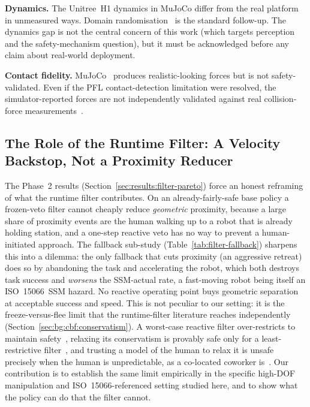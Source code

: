 \documentclass[11pt,a4paper]{report}
\newcommand{\ssm}{SSM}
\newcommand{\pfl}{PFL}
\newcommand{\iso}{ISO~15066}
\begin{document}
\textbf{Dynamics.} The Unitree~H1 dynamics in MuJoCo differ from
the real platform in unmeasured ways. Domain
randomisation~\cite{tobin2017domainrand,zhao2020sim2real} is the
standard follow-up. The dynamics gap is not the central concern of
this work (which targets perception and the safety-mechanism
question), but it must be acknowledged before any claim about
real-world deployment.

\textbf{Contact fidelity.} MuJoCo~\cite{todorov2012mujoco} produces
realistic-looking forces but is not safety-validated. Even if the
\pfl{} contact-detection limitation were resolved, the
simulator-reported forces are not independently validated against
real collision-force measurements~\cite{svarny2020collision}.

\subsection{The Role of the Runtime Filter: A Velocity Backstop, Not a Proximity Reducer}
\label{sec:disc:filter-role}

The Phase~2 results (Section~\ref{sec:results:filter-pareto}) force an
honest reframing of what the runtime filter contributes. On an
already-fairly-safe base policy a frozen-veto filter cannot cheaply
reduce \emph{geometric} proximity, because a large share of proximity
events are the human walking up to a robot that is already holding
station, and a one-step reactive veto has no way to prevent a
human-initiated approach. The fallback sub-study
(Table~\ref{tab:filter-fallback}) sharpens this into a dilemma: the
only fallback that cuts proximity (an aggressive retreat) does so by
abandoning the task and accelerating the robot, which both destroys
task success and \emph{worsens} the \ssm{}-actual rate, a fast-moving
robot being itself an \iso{}~\ssm{} hazard. No reactive operating point
buys geometric separation at acceptable success and speed. This is not
peculiar to our setting: it is the freeze-versus-flee limit that the
runtime-filter literature reaches independently
(Section~\ref{sec:bg:cbf:conservatism}). A worst-case reactive filter
over-restricts to maintain safety~\cite{tian2022confidence}, relaxing
its conservatism is provably safe only for a least-restrictive
filter~\cite{permissivefilter2025}, and trusting a model of the human to
relax it is unsafe precisely when the human is unpredictable, as a
co-located coworker is~\cite{tian2022confidence}. Our contribution is to
establish the same limit empirically in the specific high-DOF
manipulation and \iso{}-referenced setting studied here, and to show
what the policy can do that the filter cannot.
\end{document}
